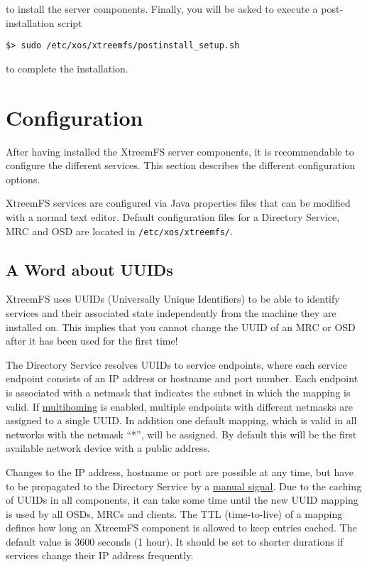 \documentclass[a4paper,10pt]{book}
\begin{document}
to install the server components. Finally, you will be asked to execute a post-installation script

\begin{verbatim}
$> sudo /etc/xos/xtreemfs/postinstall_setup.sh
\end{verbatim}

to complete the installation.

\section{Configuration}
\label{sec:service_config}

After having installed the XtreemFS server components, it is recommendable to configure the different services. This section describes the different configuration options.

XtreemFS services are configured via Java properties files that can be modified with a normal text editor. Default configuration files for a Directory Service, MRC and OSD are located in \texttt{/etc/xos/xtreemfs/}.

\subsection{A Word about UUIDs}

XtreemFS uses UUIDs (Universally Unique Identifiers) to be able to identify services and their associated state independently from the machine they are installed on. This implies that you cannot change the UUID of an MRC or OSD after it has been used for the first time!

The Directory Service resolves UUIDs to service endpoints, where each service endpoint consists of an IP address or hostname and port number. Each endpoint is associated with a netmask that indicates the subnet in which the mapping is valid. If \hyperref[option:multihoming.enabled]{multihoming} is enabled, multiple endpoints with different netmasks are assigned to a single UUID. In addition one default mapping, which is valid in all networks with the netmask ``*'', will be assigned. By default this will be the first available network device with a public address.

Changes to the IP address, hostname or port are possible at any time, but have to be propagated to the Directory Service by a \hyperref[option:multihoming.renewalsignal]{manual signal}. Due to the caching of UUIDs in all components, it can take some time until the new UUID mapping is used by all OSDs, MRCs and clients. The TTL (time-to-live) of a mapping defines how long an XtreemFS component is allowed to keep entries cached. The default value is 3600 seconds (1 hour). It should be set to shorter durations if services change their IP address frequently.
\end{document}
